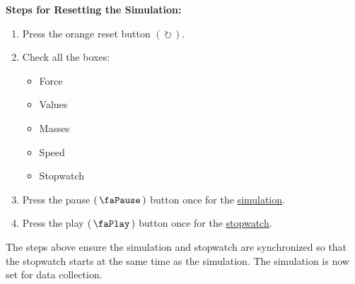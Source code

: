 \documentclass[answers]{exam}
\begin{document}
\begin{mdframed}
\noindent \textbf{Steps for Resetting the Simulation:}

\vspace{-1ex}

\begin{enumerate}[itemsep=0pt]
    \item Press the orange reset button $\left(\,\circlearrowright\,\right)$.
    \item Check all the boxes:
    \begin{itemize}[itemsep=0pt]
        \item[]  Force
        \item[]  Values
        \item[]  Masses
        \item[]  Speed
        \item[]  Stopwatch
    \end{itemize}
    \item Press the pause $\left(\,\text{\faPause}\,\right)$ button once for the \underline{simulation}.
    \item Press the play $\left(\,\text{\faPlay}\,\right)$ button once for the \underline{stopwatch}.
\end{enumerate}

\noindent The steps above ensure the simulation and stopwatch are synchronized so that the stopwatch starts at the same time as the simulation. The simulation is now set for data collection.
\end{mdframed}
\end{document}
